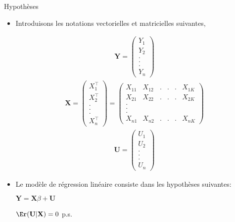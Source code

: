 \begin{frame}[allowframebreaks]{Hypothèses}
\begin{itemize}
\item  Introduisons les notations vectorielles et matricielles suivantes,

\begin{align*}
\mathbf{Y}=\left(
\begin{array}{c}
Y_1\\
Y_2\\
.\\
.\\
.\\
Y_n
\end{array}
\right)
\end{align*}
\begin{align*}
\mathbf{X}=\left(
\begin{array}{c}
X_1^\top\\
X_2^\top\\
.\\
.\\
.\\
X_n^\top
\end{array}
\right)
=
\left(
\begin{array}{cccccc}
X_{11} & X_{12}&.&.&.&X_{1K}\\
X_{21} & X_{22}&.&.&.&X_{2K}\\
.\\
.\\
.\\
X_{n1} & X_{n2}&.&.&.&X_{nK}
\end{array}
\right)
\end{align*}
\begin{align*}
\mathbf{U}=\left(
\begin{array}{c}
U_1\\
U_2\\
.\\
.\\
.\\
U_n
\end{array}
\right)
\end{align*}
\item Le modèle de régression linéaire consiste dans les hypothèses suivantes:
\begin{hypothese}
$\mathbf{Y} = \mathbf{X}\beta +\mathbf{U}$
\label{hy1}
\end{hypothese}
\begin{hypothese}
$\Er(\mathbf{U} | \mathbf{X}) = 0$ p.s.
\label{hy2}
\end{hypothese}

\end{itemize}
\end{frame}
